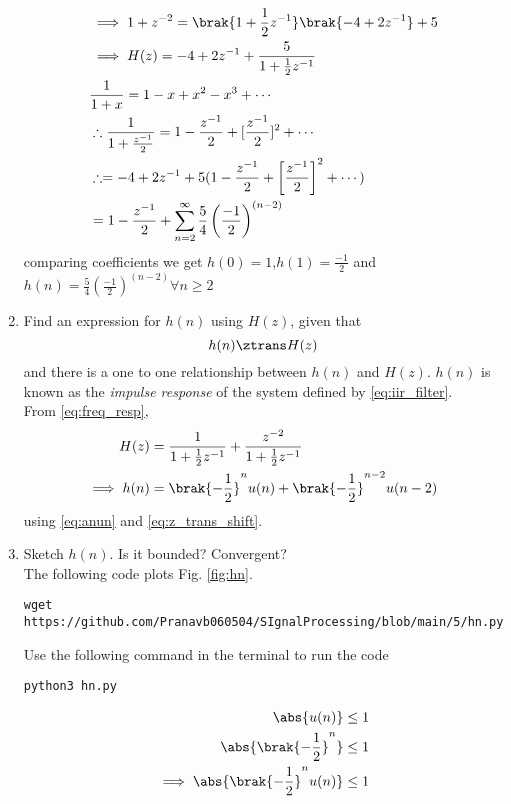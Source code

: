 \documentclass[journal,12pt,twocolumn]{IEEEtran}
\renewcommand\thesection{\arabic{section}}
\begin{document}
\begin{enumerate}[label=\thesection.\arabic*]
	\begin{align}
		&\implies 1 + z^{-2} = \brak{1 + \frac12 z^{-1}}\brak{-4 + 2z^{-1}} + 5 \\
		&\implies H(z) = -4 + 2z^{-1} + \frac{5}{1 + \frac12 z^{-1}}\\
		&\frac{1}{1+x}=1-x+x^2-x^3+\cdots\\
		&\therefore \frac{1}{1+\frac{z^{-1}}{2}}=1-\frac{z^{-1}}{2}+[\frac{z^{-1}}{2}]^{2}+\cdots\\
		&\therefore =-4+2z^{-1}+5(1-\frac{z^{-1}}{2}+\left[\frac{z^{-1}}{2}\right]^{2}+\cdots)\\
		&=1-\frac{z^{-1}}{2}+\sum_{n=2}^{\infty}\frac{5}{4} \left(\frac{-1}{2}\right)^{(n-2)}\\
		\end{align}
		comparing coefficients we get $h(0)=1$,$h(1)=\frac{-1}{2}$ and $h(n)=\frac{5}{4} \left(\frac{-1}{2}\right)^{(n-2)} \forall n \geq 2$\\
\item \label{prob:impulse_resp}
Find an expression for $h(n)$ using $H(z)$, given that 
\begin{equation}
\label{eq:impulse_resp}
h(n) \ztrans H(z)
\end{equation}
and there is a one to one relationship between $h(n)$ and $H(z)$. $h(n)$ is known as the {\em impulse response} of the
system defined by \eqref{eq:iir_filter}.
\\
\solution From \eqref{eq:freq_resp},
\begin{align}
H(z) &= \frac{1}{1 + \frac{1}{2}z^{-1}} + \frac{ z^{-2}}{1 + \frac{1}{2}z^{-1}}
\\
\implies h(n) &= \brak{-\frac{1}{2}}^{n}u(n) + \brak{-\frac{1}{2}}^{n-2}u(n-2)
\end{align}
using \eqref{eq:anun} and \eqref{eq:z_trans_shift}.
\item Sketch $h(n)$. Is it bounded? Convergent? 
\\
\solution The following code plots Fig. \ref{fig:hn}.
\begin{lstlisting}
wget https://github.com/Pranavb060504/SIgnalProcessing/blob/main/5/hn.py
\end{lstlisting}
Use the following command in the terminal to run the code
\begin{lstlisting}
python3 hn.py
\end{lstlisting}
\begin{align}
		\abs{u(n)} &\le 1 \\
		\abs{\brak{-\frac12}^n} &\le 1 \\
		\implies \abs{\brak{-\frac12}^n u(n)} &\le 1
	\end{align}
	

\end{enumerate}
\end{document}
